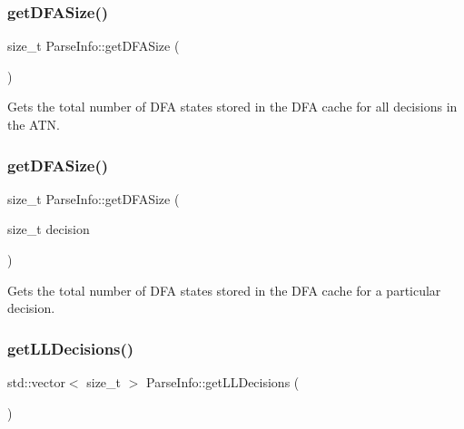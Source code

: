 \subsubsection{\texorpdfstring{get\+D\+F\+A\+Size()}{getDFASize()}\hspace{0.1cm}{\footnotesize\ttfamily [1/2]}}
{\footnotesize\ttfamily size\+\_\+t Parse\+Info\+::get\+D\+F\+A\+Size (\begin{DoxyParamCaption}{ }\end{DoxyParamCaption})\hspace{0.3cm}{\ttfamily [virtual]}}



Gets the total number of D\+FA states stored in the D\+FA cache for all decisions in the A\+TN. 

\mbox{\label{classantlr4_1_1atn_1_1ParseInfo_a335833b728bcbe7badebfcd88caf37f3}} 
\subsubsection{\texorpdfstring{get\+D\+F\+A\+Size()}{getDFASize()}\hspace{0.1cm}{\footnotesize\ttfamily [2/2]}}
{\footnotesize\ttfamily size\+\_\+t Parse\+Info\+::get\+D\+F\+A\+Size (\begin{DoxyParamCaption}\item[{size\+\_\+t}]{decision }\end{DoxyParamCaption})\hspace{0.3cm}{\ttfamily [virtual]}}



Gets the total number of D\+FA states stored in the D\+FA cache for a particular decision. 

\mbox{\label{classantlr4_1_1atn_1_1ParseInfo_a6f9fb6e5fc44568c6e6f0337ff9cb357}} 
\subsubsection{\texorpdfstring{get\+L\+L\+Decisions()}{getLLDecisions()}}
{\footnotesize\ttfamily std\+::vector$<$ size\+\_\+t $>$ Parse\+Info\+::get\+L\+L\+Decisions (\begin{DoxyParamCaption}{ }\end{DoxyParamCaption})\hspace{0.3cm}{\ttfamily [virtual]}}



